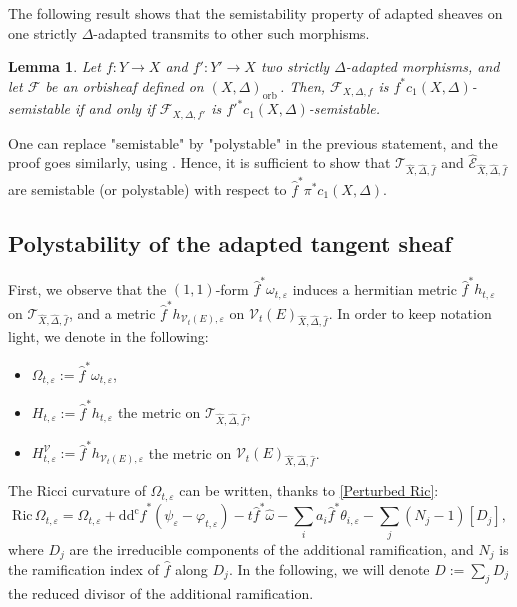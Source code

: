 \documentclass[12pt,a4paper]{amsart}
\newcommand{\orb}{\mathrm{orb}\,}
\newcommand{\ddc}{\mathrm{dd^c}}
\newcommand{\Ric}{\mathrm{Ric}\,}
\theoremstyle{plain}
\newtheorem{lemm}[theo]{Lemma}
\theoremstyle{definition}
\begin{document}
The following result shows that the semistability property of adapted sheaves on one strictly $\Delta$-adapted transmits to other such morphisms.

\begin{lemm}\textup{\cite[Prop.~3.11]{Dai25}}
	Let $f : Y \to X$ and $f' : Y' \to X$ two strictly $\Delta$-adapted morphisms, and let $\mathcal{F}$ be an orbisheaf defined on $(X, \Delta)_\orb$. Then, $\mathcal{F}_{X, \Delta, f}$ is $f^*c_1(X, \Delta)$-semistable if and only if $\mathcal{F}_{X, \Delta, f'}$ is $f'^*c_1(X, \Delta)$-semistable. 
\end{lemm}

One can replace "semistable" by "polystable" in the previous statement, and the proof goes similarly, using \cite[Lemma.~3.2.3]{HL10}. Hence, it is sufficient to show that $\mathcal{T}_{\widehat{X}, \widehat{\Delta}, \widehat{f}}$ and $\widehat{\mathcal{E}}_{\widehat{X}, \widehat{\Delta}, \widehat{f}}$ are semistable (or polystable) with respect to $\widehat{f}^*\pi^*c_1(X, \Delta)$.

\subsection{Polystability of the adapted tangent sheaf}

First, we observe that the $(1,1)$-form $\widehat{f}^*\omega_{t, \varepsilon}$ induces a hermitian metric $\widehat{f}^*h_{t, \varepsilon}$ on $\mathcal{T}_{\widehat{X}, \widehat{\Delta}, \widehat{f}}$, 
and a metric $\widehat{f}^*h_{\mathcal{V}_t(E), \varepsilon}$ on $\mathcal{V}_t(E)_{\widehat{X}, \widehat{\Delta}, \widehat{f}}$. In order to keep notation light, we denote in the following:
\begin{itemize}
    \item $\Omega_{t,\varepsilon} := \widehat{f}^*\omega_{t, \varepsilon}$,
    \item $H_{t, \varepsilon} := \widehat{f}^*h_{t, \varepsilon}$ the metric on $\mathcal{T}_{\widehat{X}, \widehat{\Delta}, \widehat{f}}$,
    \item $H^{\mathcal{V}}_{t, \varepsilon} := \widehat{f}^*h_{\mathcal{V}_t(E), \varepsilon}$ the metric on $\mathcal{V}_t(E)_{\widehat{X}, \widehat{\Delta}, \widehat{f}}$.
\end{itemize}
The Ricci curvature of $\Omega_{t, \varepsilon}$ can be written, thanks to \eqref{Perturbed Ric}:
\begin{equation}\label{Ricci perturbed ramified}
    \Ric \Omega_{t, \varepsilon} = \Omega_{t, \varepsilon} + \ddc \widehat{f}^*(\psi_\varepsilon - \varphi_{t, \varepsilon}) - t\widehat{f}^*\widehat{\omega} - \sum_i a_i \widehat{f}^*\theta_{i, \varepsilon} - \sum_j (N_j - 1)\left[ D_j \right],
\end{equation}
where $D_j$ are the irreducible components of the additional ramification, and $N_j$ is the ramification index of $\widehat{f}$ along $D_j$. In the following, we will denote $D := \sum_j D_j$ the reduced divisor of the additional ramification.
\end{document}
